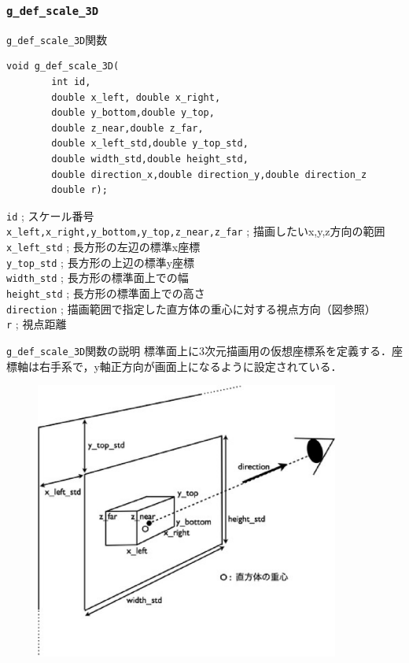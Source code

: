 \documentclass[a4paper,12pt]{jsarticle}%
\begin{document}
\clearpage
\subsubsection{\texttt{g\_def\_scale\_3D}}

\begin{itembox}[l]{\texttt{g\_def\_scale\_3D}関数}
\begin{verbatim}
void g_def_scale_3D(
        int id,
        double x_left, double x_right,
        double y_bottom,double y_top,
        double z_near,double z_far,
        double x_left_std,double y_top_std,
        double width_std,double height_std,
        double direction_x,double direction_y,double direction_z
        double r);
\end{verbatim}
\verb|id| ; スケール番号\\
\verb|x_left,x_right,y_bottom,y_top,z_near,z_far| ; 描画したいx,y,z方向の範囲\\
\verb|x_left_std| ; 長方形の左辺の標準x座標\\
\verb|y_top_std| ; 長方形の上辺の標準y座標\\
\verb|width_std| ; 長方形の標準面上での幅\\
\verb|height_std| ; 長方形の標準面上での高さ\\
\verb|direction| ; 描画範囲で指定した直方体の重心に対する視点方向（図参照）\\
\verb|r| ; 視点距離 
\end{itembox}

\begin{itembox}[l]{\texttt{g\_def\_scale\_3D}関数の説明}
標準面上に3次元描画用の仮想座標系を定義する．座標軸は右手系で，y軸正方向が画面上になるように設定されている．
\end{itembox}

\begin{figure}[htb]
	\includegraphics[width=100mm]{./Figures/eps/Canvas_g_def_scale_3D.eps}
\end{figure}
\end{document}
